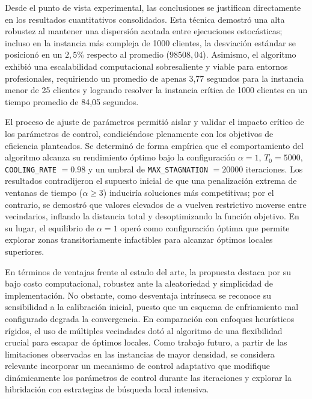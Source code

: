 \documentclass[letter, 10pt, dvipdfmx]{article}
\begin{document}
Desde el punto de vista experimental, las conclusiones se justifican directamente en los resultados cuantitativos consolidados.
Esta técnica demostró una alta robustez al mantener una dispersión acotada entre ejecuciones estocásticas; incluso en
la instancia más compleja de 1000 clientes, la desviación estándar se posicionó en un $2,5\%$ respecto al promedio
($98508,04$). Asimismo, el algoritmo exhibió una escalabilidad computacional sobresaliente y viable para entornos
profesionales, requiriendo un promedio de apenas 3,77 segundos para la instancia menor de 25 clientes y logrando resolver
la instancia crítica de 1000 clientes en un tiempo promedio de 84,05 segundos.

El proceso de ajuste de parámetros permitió aislar y validar el impacto crítico de los parámetros de control,
condiciéndose plenamente con los objetivos de eficiencia planteados. Se determinó de forma empírica que el comportamiento
del algoritmo alcanza su rendimiento óptimo bajo la configuración $\alpha=1$, $T_0=5000$, \texttt{COOLING\_RATE} $=0.98$ y un
umbral de \texttt{MAX\_STAGNATION} $=20000$ iteraciones. Los resultados contradijeron el supuesto inicial de que
una penalización extrema de ventanas de tiempo ($\alpha \geq 3$) induciría soluciones más competitivas; por el contrario,
se demostró que valores elevados de $\alpha$ vuelven restrictivo moverse entre vecindarios, inflando la distancia total
y desoptimizando la función objetivo. En su lugar, el equilibrio de $\alpha=1$ operó como configuración óptima que permite
explorar zonas transitoriamente infactibles para alcanzar óptimos locales superiores.

En términos de ventajas frente al estado del arte, la propuesta destaca por su bajo costo computacional,
robustez ante la aleatoriedad y simplicidad de implementación. No obstante, como desventaja intrínseca se
reconoce su sensibilidad a la calibración inicial, puesto que un esquema de enfriamiento mal configurado
degrada la convergencia. En comparación con enfoques heurísticos rígidos, el uso de múltiples vecindades
dotó al algoritmo de una flexibilidad crucial para escapar de óptimos locales. Como trabajo futuro, a
partir de las limitaciones observadas en las instancias de mayor densidad, se considera relevante incorporar
un mecanismo de control adaptativo que modifique dinámicamente los parámetros de control durante las iteraciones
y explorar la hibridación con estrategias de búsqueda local intensiva.
\end{document}
